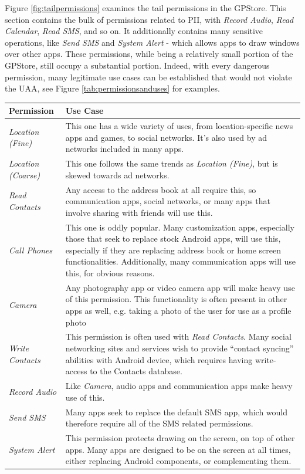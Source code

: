 Figure \ref{fig:tailpermissions} examines the tail permissions in the GPStore. This section contains the bulk of permissions related to PII, with \textit{Record Audio}, \textit{Read Calendar}, \textit{Read SMS}, and so on. It additionally contains many sensitive operations, like \textit{Send SMS} and \textit{System Alert} - which allows apps to draw windows over other apps. These permissions, while being a relatively small portion of the GPStore, still occupy a substantial portion. Indeed, with every dangerous permission, many legitimate use cases can be established that would not violate the UAA, see Figure \ref{tab:permissionsanduses} for examples.

\begin{table}[h]
\begin{small}
\begin{tabular}{p{3cm}|p{12.5cm}}
Permission & Use Case \\
\hline

\textit{Location (Fine)} & This one has a wide variety of uses, from location-specific news apps and games, to social networks. It's also used by ad networks included in many apps.  \\
\textit{Location (Coarse)} & This one follows the same trends as \textit{Location (Fine)}, but is skewed towards ad networks.  \\
\textit{Read Contacts} & Any access to the address book at all require this, so communication apps, social networks, or many apps that involve sharing with friends will use this.  \\
\textit{Call Phones} & This one is oddly popular. Many customization apps, especially those that seek to replace stock Android apps, will use this, especially if they are replacing address book or home screen functionalities. Additionally, many communication apps will use this, for obvious reasons.  \\
\textit{Camera} & Any photography app or video camera app will make heavy use of this permission. This functionality is often present in other apps as well, e.g. taking a photo of the user for use as a profile photo  \\
\textit{Write Contacts} & This permission is often used with \textit{Read Contacts}. Many social networking sites and services wish to provide ``contact syncing'' abilities with Android device, which requires having write-access to the Contacts database.  \\
\textit{Record Audio} & Like \textit{Camera}, audio apps and communication apps make heavy use of this.  \\
\textit{Send SMS} & Many apps seek to replace the default SMS app, which would therefore require all of the SMS related permissions.  \\
\textit{System Alert} & This permission protects drawing on the screen, on top of other apps. Many apps are designed to be on the screen at all times, either replacing Android components, or complementing them.  \\


\end{tabular}
\end{small}
\end{table}

